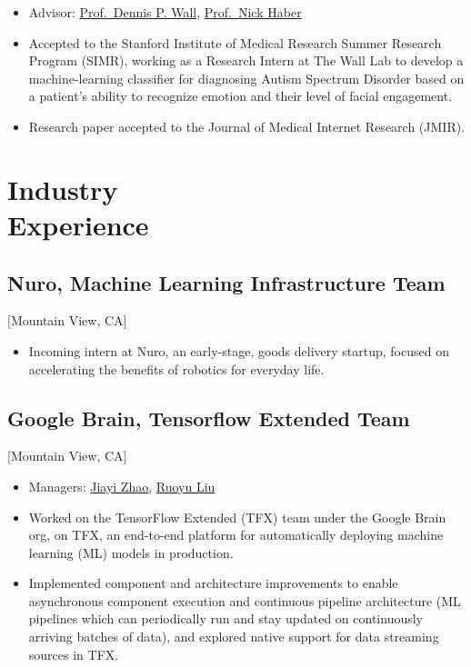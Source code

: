 \documentclass{mycv}
\begin{document}
\begin{itemize}
  \item Advisor: \href{https://profiles.stanford.edu/dennis-wall}{Prof.~Dennis P. Wall}, \href{https://ed.stanford.edu/faculty/nhaber}{Prof.~Nick Haber}
  \item Accepted to the Stanford Institute of Medical Research Summer Research Program (SIMR), working as a Research Intern at The Wall Lab to develop a machine-learning classifier for diagnosing Autism Spectrum Disorder based on a patient's ability to recognize emotion and their level of facial engagement.
  \item Research paper accepted to the Journal of Medical Internet Research (JMIR).
\end{itemize}

\section{Industry \\ Experience}

\subsection{Nuro, Machine Learning Infrastructure Team}[Mountain View, CA]
\begin{positions}
\end{positions}
\begin{itemize}
  \item Incoming intern at Nuro, an early-stage, goods delivery startup, focused on accelerating the benefits of robotics for everyday life.
\end{itemize}


\subsection{Google Brain, Tensorflow Extended Team}[Mountain View, CA]
\begin{positions}
\end{positions}

\begin{itemize}
  \item Managers: \href{https://www.linkedin.com/in/\%E5\%98\%89\%E4\%BA\%BF-\%E8\%B5\%B5-8034a8a3/}{Jiayi Zhao},  \href{https://www.linkedin.com/in/ruoyu-liu-b5a67154/}{Ruoyu Liu}
  \item Worked on the TensorFlow Extended (TFX) team under the Google Brain org, on TFX, an end-to-end platform for automatically deploying machine learning (ML) models in production. 
  \item Implemented component and architecture improvements to enable asynchronous component execution and continuous pipeline architecture (ML pipelines which can periodically run and stay updated on continuously arriving batches of data), and explored native support for data streaming sources in TFX.
\end{itemize}
\end{document}
